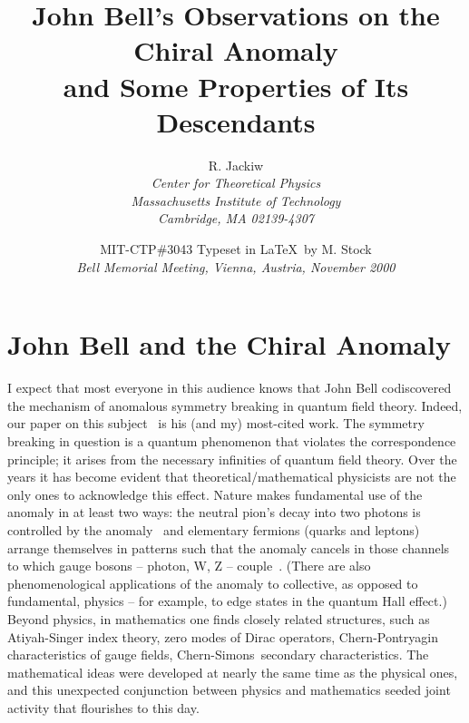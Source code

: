 \documentclass[a4paper,12pt,twoside]{article}
\providecommand{\CS}{Chern-Simons}
\begin{document}
 
\title{John Bell's Observations on the Chiral Anomaly\\
and Some Properties of Its Descendants}
\author{R. Jackiw\\
\small\it Center for Theoretical Physics\\ 
\small\it Massachusetts Institute of Technology\\ 
\small\it Cambridge, MA 02139-4307}
\date{\small MIT-CTP\#3043 \quad Typeset in \LaTeX\ by M. Stock\\[1ex]
\normalsize\itshape Bell Memorial Meeting, Vienna, Austria, November 2000}
\maketitle


\pagestyle{myheadings}
\thispagestyle{empty}


\section{John Bell and the Chiral Anomaly}

I expect that most everyone in this audience knows that John Bell codiscovered the
mechanism of anomalous symmetry breaking in quantum field theory. Indeed, our
paper on this subject~\cite{ref1} is his (and my) most-cited work. The symmetry
breaking in question is a quantum phenomenon that violates the correspondence
principle; it arises from the necessary infinities of quantum field theory. Over the
years it has become evident that theoretical/mathematical physicists are not the only
ones to acknowledge this effect. Nature makes fundamental use of the anomaly in at
least two ways: the neutral pion's decay into two photons is controlled by the
anomaly~\cite{ref1,ref2} and elementary fermions (quarks and leptons) arrange
themselves in patterns such that the anomaly cancels in those channels to which
gauge bosons -- photon, W,  Z  -- couple~\cite{ref3}. (There are also phenomenological
applications of the anomaly to collective, as opposed to fundamental, physics -- for
example, to edge states in the quantum Hall  effect.) Beyond physics, in mathematics
one finds closely related structures, such as Atiyah-Singer index theory, zero modes
of Dirac operators, Chern-Pontryagin characteristics of gauge fields, \CS\ secondary
characteristics. The mathematical ideas were developed at nearly the same time as
the physical ones, and this unexpected conjunction between physics and mathematics
seeded joint activity that flourishes to this day. 
\end{document}
